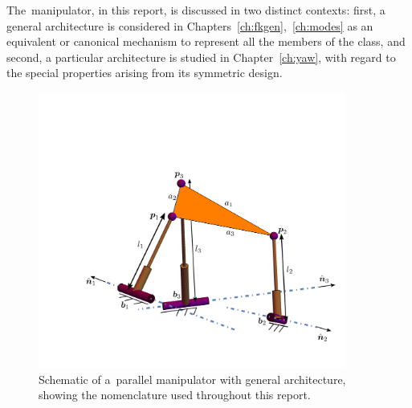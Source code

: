 \documentclass[DD]{iitmdiss}
\newcommand{\mref}[1]{\ref{#1}}
\newcommand{\mlabel}[1]{\label{#1}}
\begin{document}
The~\rps manipulator, in this report, is discussed in two distinct contexts: first, a general architecture is considered in Chapters~\mref{ch:fkgen},~\mref{ch:modes} as an equivalent or canonical mechanism to represent all the members of the class, and second, a particular architecture is studied in Chapter~\mref{ch:yaw}, with regard to the special properties arising from its symmetric design. 
\begin{figure}[h]
	\centering
	\includegraphics[width=0.9\textwidth]{rps.png}
	\caption{Schematic of a~\rps parallel manipulator with general architecture, showing the nomenclature used throughout this report.}
	\mlabel{fg:rps}
\end{figure}
%
\end{document}

